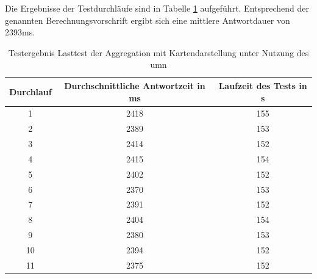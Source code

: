 Die Ergebnisse der Testdurchläufe sind in Tabelle \ref{tbl:ergebnisseTest1UMN} aufgeführt.
Entsprechend der genannten Berechnungsvorschrift ergibt sich eine mittlere Antwortdauer von 2393ms.
\begin{table}[h!]
\centering
\begin{tabular}{c|c|c}
\textbf{Durchlauf} & \textbf{Durchschnittliche Antwortzeit in ms} & \textbf{Laufzeit des Tests in s} \\ \hline
1 & 2418 & 155 \\ \hline
2 & 2389 & 153 \\ \hline
3 & 2414 & 152 \\ \hline
4 & 2415 & 154 \\ \hline 
5 & 2402 & 152 \\ \hline
6 & 2370 & 153 \\ \hline
7 & 2391 & 152 \\ \hline
8 & 2404 & 154 \\ \hline 
9 & 2380 & 153 \\ \hline
10 & 2394 & 152 \\ \hline
11 & 2375 & 152 \\ 			
\end{tabular}
\caption[Testergebnis Lasttest der Aggregation mit Kartendarstellung]{Testergebnis Lasttest der Aggregation mit Kartendarstellung unter Nutzung des \Gls{umn}}
\label{tbl:ergebnisseTest1UMN}
\end{table}

